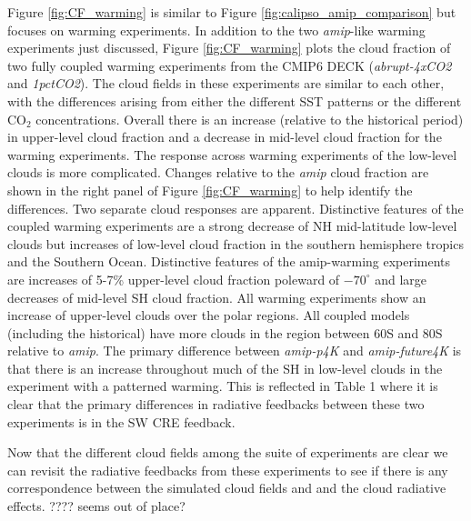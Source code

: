 \documentclass[draft]{agujournal2019}
\begin{document}
Figure \ref{fig:CF_warming}  is similar to Figure \ref{fig:calipso_amip_comparison} but focuses on
warming experiments.  
In addition to the two \textit{amip}-like warming experiments just discussed, Figure \ref{fig:CF_warming} 
plots the cloud fraction of two fully coupled warming experiments from the CMIP6 DECK 
(\textit{abrupt-4xCO2} and \textit{1pctCO2}). The cloud fields in these experiments are 
similar to each other, with the differences arising from either the different SST patterns or the 
different CO$_{2}$ concentrations.  
Overall there is an increase (relative to the historical period) in upper-level cloud fraction and a 
decrease in mid-level cloud fraction for the warming experiments.   The response across warming experiments
of the low-level clouds is more complicated.  Changes relative to the \textit{amip} cloud fraction are shown 
in the right panel of Figure \ref{fig:CF_warming} to help identify the differences.  Two separate cloud responses are apparent.  
Distinctive features of the coupled warming experiments are a strong decrease of NH 
mid-latitude low-level clouds but increases of low-level cloud fraction in the southern hemisphere tropics and the Southern Ocean.  
Distinctive features of the amip-warming experiments are increases of 5-7\% 
upper-level cloud fraction poleward of $-70^\circ$ and large decreases of mid-level SH cloud fraction.  All warming
experiments show an increase of upper-level clouds over the polar regions.  All coupled models 
(including the historical)  have more clouds in the region between 60S and 80S relative to \textit{amip}.
The primary difference between \textit{amip-p4K} and \textit{amip-future4K} is that there is an increase 
throughout much of the SH in low-level clouds in the experiment with a patterned warming.  This is 
reflected in Table 1 where it is clear that the primary differences in radiative feedbacks between these
two experiments is in the SW CRE feedback.  

Now that the different cloud fields among the suite of experiments are clear we can revisit the
radiative feedbacks from these experiments to see if there is any correspondence between the 
simulated cloud fields and and the cloud radiative effects.      ???? seems out of place?


% 
\end{document}
